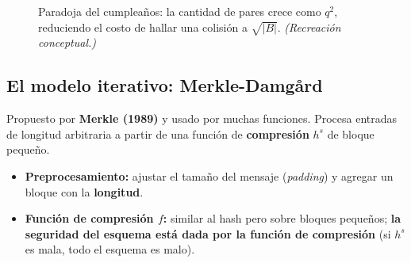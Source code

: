 \documentclass[11pt,a4paper]{article}
\begin{document}
\begin{figure}[h]
\centering
{}
\caption{Paradoja del cumpleaños: la cantidad de pares crece como $q^2$, reduciendo el costo
de hallar una colisión a $\sqrt{|B|}$. \textit{(Recreación conceptual.)}}
\end{figure}

\subsection{El modelo iterativo: Merkle-Damgård}
Propuesto por \textbf{Merkle (1989)} y usado por muchas funciones. Procesa entradas de
longitud arbitraria a partir de una función de \textbf{compresión} $h^s$ de bloque pequeño.

\begin{itemize}[leftmargin=1.4em,itemsep=1pt]
  \item \textbf{Preprocesamiento:} ajustar el tamaño del mensaje (\emph{padding}) y agregar
        un bloque con la \textbf{longitud}.
  \item \textbf{Función de compresión $f$:} similar al hash pero sobre bloques pequeños;
        \textbf{la seguridad del esquema está dada por la función de compresión} (si $h^s$ es
        mala, todo el esquema es malo).
\end{itemize}
\end{document}
